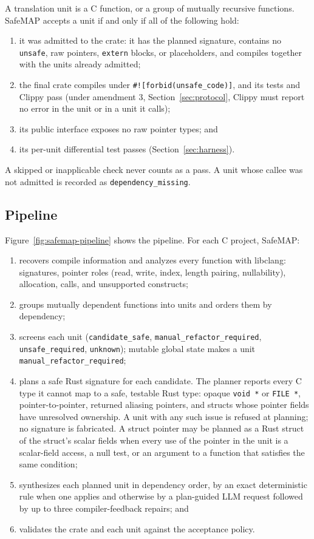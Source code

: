 \documentclass[pdflatex,sn-basic]{sn-jnl}
\newcommand{\tool}{SafeMAP\xspace}
\begin{document}
A translation unit is a C function, or a group of mutually recursive
functions. \tool accepts a unit if and only if all of the following hold:

\begin{enumerate}
  \item it was admitted to the crate: it has the planned signature, contains
  no \texttt{unsafe}, raw pointers, \texttt{extern} blocks, or placeholders,
  and compiles together with the units already admitted;
  \item the final crate compiles under \texttt{\#![forbid(unsafe\_code)]},
  and its tests and Clippy pass (under amendment 3,
  Section~\ref{sec:protocol}, Clippy must report no error in the unit or in a
  unit it calls);
  \item its public interface exposes no raw pointer types; and
  \item its per-unit differential test passes (Section~\ref{sec:harness}).
\end{enumerate}

A skipped or inapplicable check never counts as a pass. A unit whose callee
was not admitted is recorded as \texttt{dependency\_missing}.

\subsection{Pipeline}

Figure~\ref{fig:safemap-pipeline} shows the pipeline. For each C project,
\tool:

\begin{enumerate}
  \item recovers compile information and analyzes every function with
  libclang: signatures, pointer roles (read, write, index, length pairing,
  nullability), allocation, calls, and unsupported constructs;
  \item groups mutually dependent functions into units and orders them by
  dependency;
  \item screens each unit (\texttt{candidate\_safe},
  \texttt{manual\_refactor\_required}, \texttt{unsafe\_required},
  \texttt{unknown}); mutable global state makes a unit
  \texttt{manual\_refactor\_required};
  \item plans a safe Rust signature for each candidate. The planner reports
  every C type it cannot map to a safe, testable Rust type: opaque
  \texttt{void *} or \texttt{FILE *}, pointer-to-pointer, returned aliasing
  pointers, and structs whose pointer fields have unresolved ownership. A unit
  with any such issue is refused at planning; no signature is fabricated. A
  struct pointer may be planned as a Rust struct of the struct's scalar fields
  when every use of the pointer in the unit is a scalar-field access, a null
  test, or an argument to a function that satisfies the same condition;
  \item synthesizes each planned unit in dependency order, by an exact
  deterministic rule when one applies and otherwise by a plan-guided LLM
  request followed by up to three compiler-feedback repairs; and
  \item validates the crate and each unit against the acceptance policy.
\end{enumerate}
\end{document}
